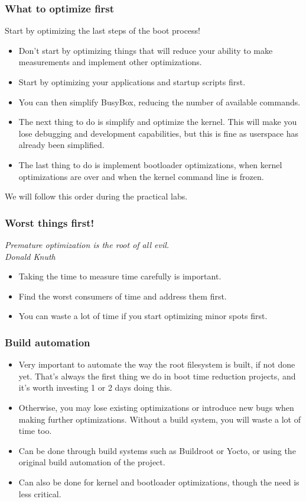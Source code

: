 \begin{frame}
\frametitle{What to optimize first}
Start by optimizing the last steps of the boot process!
\begin{itemize}
\item Don't start by optimizing things that will reduce your ability to 
      make measurements and implement other optimizations.
\item Start by optimizing your applications and startup
      scripts first.
\item You can then simplify BusyBox, reducing the number of available
      commands.
\item The next thing to do is simplify and optimize the kernel. This
      will make you lose debugging and development capabilities,
      but this is fine as userspace has already been simplified.
\item The last thing to do is implement bootloader optimizations,
      when kernel optimizations are over and when the kernel command
      line is frozen.
\end{itemize}
We will follow this order during the practical labs.
\end{frame}

\begin{frame}
\frametitle{Worst things first!}
{\em Premature optimization is the root of all evil.\\
Donald Knuth}     
\begin{itemize}
\item Taking the time to measure time carefully is important.
\item Find the worst consumers of time and address them first.
\item You can waste a lot of time if you start optimizing
      minor spots first.
\end{itemize}
\end{frame}

\begin{frame}
\frametitle{Build automation}
\begin{itemize}
\item Very important to automate the way the root filesystem is built,
      if not done yet. That's always the first thing we do in boot time
      reduction projects, and it's worth investing 1 or 2 days doing
      this.
\item Otherwise, you may lose existing optimizations or introduce new bugs
      when making further optimizations. Without a build system,
      you will waste a lot of time too.
\item Can be done through build systems such as Buildroot or Yocto,
      or using the original build automation of the project.
\item Can also be done for kernel and bootloader optimizations, though
      the need is less critical.
\end{itemize}
\end{frame}


